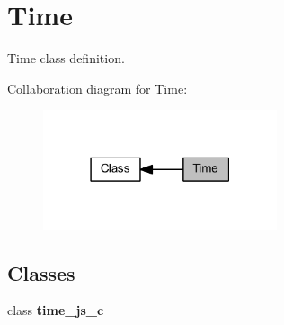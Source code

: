 \section{Time}
\label{group___time}


Time class definition.  


Collaboration diagram for Time\+:
\nopagebreak
\begin{figure}[H]
\begin{center}
\leavevmode
\includegraphics[width=195pt]{group___time}
\end{center}
\end{figure}
\subsection*{Classes}
\begin{DoxyCompactItemize}
\item 
class \textbf{ time\+\_\+js\+\_\+c}
\end{DoxyCompactItemize}
